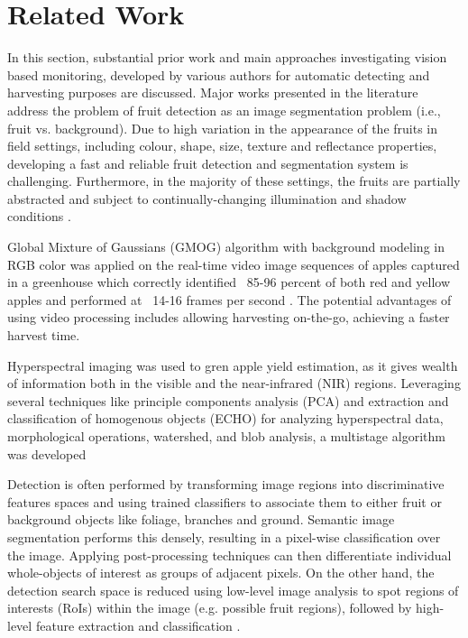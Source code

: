 \documentclass[12pt]{article}
\begin{document}
\section{Related Work}
In this section, substantial prior work and main approaches investigating vision based monitoring, developed by various authors for automatic detecting and harvesting purposes are discussed. Major works presented in the literature address the problem of fruit detection as an image segmentation problem (i.e., fruit vs. background).  Due to high variation in the appearance of the fruits in field settings, including colour, shape, size, texture and reflectance properties, developing a fast and reliable fruit detection and segmentation system is challenging. Furthermore, in the majority of these settings, the fruits are partially abstracted and subject to continually-changing illumination and shadow conditions \cite{sa2016deepfruits}.

 Global Mixture of Gaussians (GMOG) algorithm with background modeling in RGB color was applied on the real-time video image sequences of apples captured in a greenhouse which correctly identified ~85-96 percent of both red and yellow apples and performed at ~14-16 frames per second \cite{article_Tabb}. The potential advantages of using video processing includes allowing harvesting on-the-go, achieving a faster harvest time. 

Hyperspectral imaging was used to gren apple yield estimation, as it gives wealth of information both in the visible and the near-infrared (NIR) regions. Leveraging several techniques like principle components analysis (PCA) and extraction and classification of homogenous objects (ECHO) for analyzing hyperspectral data, morphological operations, watershed, and blob analysis, a multistage algorithm was developed \cite{article_safren}

Detection is often performed by transforming image regions into discriminative features spaces and using trained classifiers to associate them to either fruit or background objects like foliage, branches and ground. Semantic image segmentation performs this densely, resulting in a pixel-wise classification over the image. Applying post-processing techniques can then differentiate individual whole-objects of interest as groups of adjacent pixels. On the other hand, the detection search space is reduced using low-level image analysis to spot regions of interests (RoIs) within the image (e.g. possible fruit regions), followed by high-level feature extraction and classification \cite{7989417_Bargoti}. 
\end{document}
